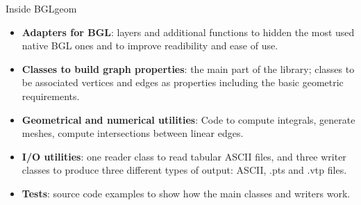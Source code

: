 \documentclass[11pt]{beamer}
\begin{document}
	\begin{frame}{Inside BGLgeom}
		\begin{itemize}
			\item \textbf{Adapters for BGL}: layers and additional functions to hidden the most used native BGL ones and to improve readibility and ease of use.
			\item \textbf{Classes to build graph properties}: the main part of the library; classes to be associated vertices and edges
			as properties including the basic geometric requirements.
			\item \textbf{Geometrical and numerical utilities}: Code to compute integrals, generate meshes, compute intersections between linear edges.
			\item \textbf{I/O utilities}: one reader class to read tabular ASCII files, and three writer classes to produce three different types of output: ASCII, .pts and .vtp files.
			\item \textbf{Tests}: source code examples to show how the main classes and writers work.
		\end{itemize}
	\end{frame}
	
\end{document}
